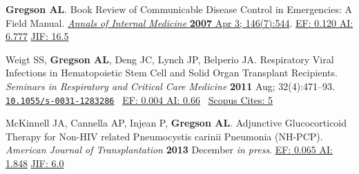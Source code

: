 \documentclass[12pt]{moderncv} %
\begin{document}
\begin{thebibliography}{1}
    \bibitem[3]{} \textbf{Gregson AL}. Book Review of Communicable Disease Control in Emergencies: A Field Manual. \href{http://www.annals.org/cgi/content/full/146/7/544-a?maxtoshow=&HITS=10&hits=10&RESULTFORMAT=&fulltext=gregson&searchid=1&FIRSTINDEX=0&resourcetype=HWCIT}{\textcolor{journalcolor}{\textit{Annals of Internal Medicine}} \textbf{2007} Apr 3; 146(7):544}. {\color{subsectioncolor}\href{http://www.eigenfactor.org/rankings.php?search=ANNALS+OF+INTERNAL+MEDICINE&search2=&search3=&searchby=journal}{{\smaller EF: 0.120 AI: 6.777}} \href{http://admin-apps.isiknowledge.com/JCR/JCR?RQ=RECORD&rank=1&journal=ANN+INTERN+MED}{{\smaller JIF: 16.5}}}

  \bibitem[4]{} Weigt SS, \textbf{Gregson AL}, Deng JC, Lynch JP, Belperio JA. Respiratory Viral Infections in Hematopoietic Stem Cell and Solid Organ Transplant Recipients. {\color{journalcolor}\textit{Seminars in Respiratory and Critical Care Medicine}} \textbf{2011} Aug; 32(4):471--93. \href{http://dx.doi.org/10.1055/s-0031-1283286}{\nolinkurl{10.1055/s-0031-1283286}}~ 
    {\color{subsectioncolor} \href{http://www.eigenfactor.org/rankings.php?search=SEMINARS+IN+RESPIRATORY+AND+CRITICAL+CARE+MEDICINE&search2=&search3=&searchby=journal}{{\smaller EF: 0.004 AI: 0.66}}~
      \href{http://www.scopus.com/record/display.url?eid=2-s2.0-80051960857&origin=inward&txGid=2728424DD3A06399B3857C04F09A7B4B.N5T5nM1aaTEF8rE6yKCR3A%3a4}{{\smaller Scopus Cites: 5}}
      }

  \bibitem[5]{} McKinnell JA, Cannella AP, Injean P, \textbf{Gregson AL}. Adjunctive Glucocorticoid Therapy for Non-{\smaller HIV} related Pneumocystis carinii Pneumonia ({\smaller NH-PCP}).
{\color{journalcolor}\textit{American Journal of Transplantation}} \textbf{2013} December \textit{in press}.
       {\color{subsectioncolor}\href{http://www.eigenfactor.org/detail.php?year=2006&jrlname=AM%20J%20TRANSPLANT&issnnum=1600-6135}{{\smaller EF: 0.065 AI: 1.848}} 
       \href{http://admin-apps.webofknowledge.com/JCR/JCR?RQ=RECORD&rank=1&journal=AM+J+TRANSPLANT}{{\smaller JIF: 6.0}}~
       }

\end{thebibliography}
\closesection{}


\end{document}
